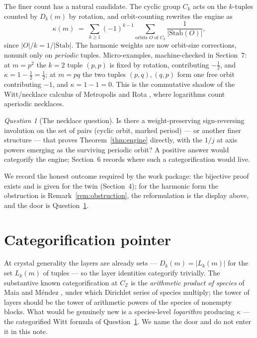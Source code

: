 \documentclass[11pt]{article}
\theoremstyle{remark}
\newtheorem{question}{Question}
\newcommand{\Z}{\mathbb{Z}}
\begin{document}
The finer count has a natural candidate. The cyclic group $C_k$ acts on the $k$-tuples counted by
$D_k(m)$ by rotation, and orbit-counting rewrites the engine as
\[
\kappa(m) \;=\; \sum_{k \ge 1} (-1)^{k-1} \sum_{\text{orbits } O \text{ of } C_k}
\frac{1}{|\mathrm{Stab}(O)|},
\]
since $|O|/k = 1/|\mathrm{Stab}|$. The harmonic weights are now orbit-size corrections, nonunit
only on \emph{periodic} tuples. Micro-examples, machine-checked in Section~7: at $m = p^2$ the
$k = 2$ tuple $(p, p)$ is fixed by rotation, contributing $-\tfrac12$, and
$\kappa = 1 - \tfrac12 = \tfrac12$; at $m = pq$ the two tuples $(p, q), (q, p)$ form one free
orbit contributing $-1$, and $\kappa = 1 - 1 = 0$. This is the commutative shadow of the
Witt/necklace calculus of Metropolis and Rota \cite{MetropolisRota}, where logarithms count
aperiodic necklaces.

\begin{question}[The necklace question]\label{q:necklace}
Is there a weight-preserving sign-reversing involution on the set of pairs (cyclic orbit, marked
period) --- or another finer structure --- that proves Theorem~\ref{thm:engine} directly, with the
$1/j$ at axis powers emerging as the surviving periodic orbit? A positive answer would categorify
the engine; Section~6 records where such a categorification would live.
\end{question}

We record the honest outcome required by the work package: the bijective proof exists and is given
for the twin (Section~4); for the harmonic form the obstruction is Remark~\ref{rem:obstruction},
the reformulation is the display above, and the door is Question~\ref{q:necklace}.

\section{Categorification pointer}

At crystal generality the layers are already sets --- $D_k(m) = |L_k(m)|$ for the set $L_k(m)$ of
tuples --- so the layer identities categorify trivially. The substantive known categorification at
$C_\Z$ is the \emph{arithmetic product of species} of Maia and M\'endez \cite{MaiaMendez}, under
which Dirichlet series of species multiply; the tower of layers should be the tower of arithmetic
powers of the species of nonempty blocks. What would be genuinely new is a species-level
\emph{logarithm} producing $\kappa$ --- the categorified Witt formula of
Question~\ref{q:necklace}. We name the door and do not enter it in this note.
\end{document}

